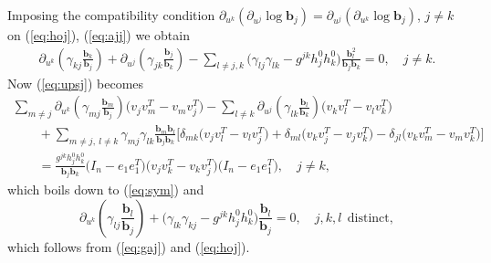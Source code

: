 \documentclass[pdftex]{sigma}
\begin{document}
Imposing the compatibility condition
$\partial_{u^k}(\partial_{u^j}\log\mathbf{b}_j)=\partial_{u^j}(\partial_{u^k}\log\mathbf{b}_j)$, $j\neq k$ on (\ref{eq:hoj}), (\ref{eq:ajj}) we obtain
\begin{gather}
\partial_{u^k}\left(\gamma_{kj}\frac{\mathbf{b}_k}{\mathbf{b}_j}\right)
+\partial_{u^j}\left(\gamma_{jk}\frac{\mathbf{b}_j}{\mathbf{b}_k}\right)-\sum_{l\neq
j,k}\big(\gamma_{lj}\gamma_{lk}-g^{jk}h_j^0h_k^0\big)\frac{\mathbf{b}_l^2}{\mathbf{b}_j\mathbf{b}_k}=0,\quad
j\neq k.\label{eq:sym}
\end{gather}
Now (\ref{eq:upsj}) becomes
\begin{gather*}
\sum_{m\neq
j}\partial_{u^k}\left(\gamma_{mj}\frac{\mathbf{b}_m}{\mathbf{b}_j}\right)\big(v_jv_m^T-v_mv_j^T\big)
-\sum_{l\neq
k}\partial_{u^j}\left(\gamma_{lk}\frac{\mathbf{b}_l}{\mathbf{b}_k}\right)\big(v_kv_l^T-v_lv_k^T\big)
\\
\qquad{}
+\sum_{m\neq j,\ l\neq
k}\gamma_{mj}\gamma_{lk}\frac{\mathbf{b}_m\mathbf{b}_l}{\mathbf{b}_j\mathbf{b}_k}
\big[\delta_{mk}\big(v_jv_l^T-v_lv_j^T\big)+\delta_{ml}\big(v_kv_j^T-v_jv_k^T\big)
-\delta_{jl}\big(v_kv_m^T-v_mv_k^T\big)\big]
\\
\qquad{}
=\frac{g^{jk}h_j^0h_k^0}{\mathbf{b}_j\mathbf{b}_k}\big(I_n-e_1e_1^T\big)\big(v_jv_k^T-v_kv_j^T\big)
\big(I_n-e_1e_1^T\big),\quad j\neq k,
\end{gather*}
which boils down to (\ref{eq:sym}) and{\samepage
\[
\partial_{u^k}\left(\gamma_{lj}\frac{\mathbf{b}_l}{\mathbf{b}_j}\right)
+\big(\gamma_{lk}\gamma_{kj}-g^{jk}h_j^0h_k^0\big)
\frac{\mathbf{b}_l}{\mathbf{b}_j}=0,\quad j,k,l\ \ \mathrm{distinct},
\]
which follows from (\ref{eq:gaj}) and (\ref{eq:hoj}).}
\end{document}
